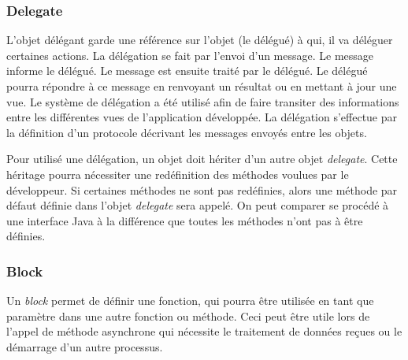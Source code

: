 \subsubsection{Delegate}

L'objet délégant garde une référence sur l'objet (le délégué) à qui, il va déléguer certaines actions. La délégation se fait par l'envoi d'un message. Le message informe le délégué. Le message est ensuite traité par le délégué. Le délégué pourra répondre à ce message en renvoyant un résultat ou en mettant à jour une vue. Le système de délégation a été utilisé afin de faire transiter des informations entre les différentes vues de l'application développée. La délégation s'effectue par la définition d'un protocole décrivant les messages envoyés entre les objets.

Pour utilisé une délégation, un objet doit hériter d'un autre objet \textit{delegate}. Cette héritage pourra nécessiter une redéfinition des méthodes voulues par le développeur. Si certaines méthodes ne sont pas redéfinies, alors une méthode par défaut définie dans l'objet \textit{delegate} sera appelé. On peut comparer se procédé à une interface Java à la différence que toutes les méthodes n'ont pas à être définies.

\subsubsection{Block}

Un \textit{block} permet de définir une fonction, qui pourra être utilisée en tant que paramètre dans une autre fonction ou méthode. Ceci peut être utile lors de l'appel de méthode asynchrone qui nécessite le traitement de données reçues ou le démarrage d'un autre processus.